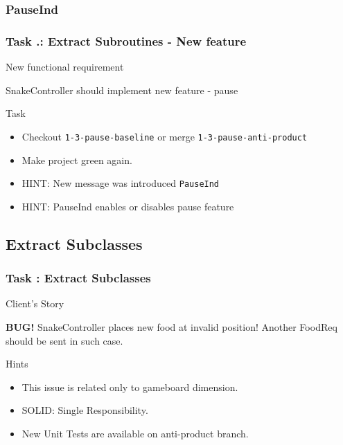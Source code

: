 \documentclass[english]{beamer}
\newenvironment{narrowblock}[1]{%
\begin{center}
\begin{minipage}{10.5cm}
\begin{block}{#1}
}{%
\end{block}
\end{minipage}
\end{center}
}
\begin{document}
\subsubsection{PauseInd}

\begin{frame}
\frametitle{Task \thesubsection.\thesubsubsection: Extract Subroutines - New feature}

\begin{narrowblock}{New functional requirement}
SnakeController should implement new feature - pause
\end{narrowblock}

\pause
\begin{narrowblock}{Task}
\begin{itemize}[<+->]
 \item Checkout \texttt{1-3-pause-baseline} or merge \texttt{1-3-pause-anti-product}
 \item Make project green again.
 \item HINT: New message was introduced \texttt{PauseInd}
 \item HINT: PauseInd enables or disables pause feature
\end{itemize}
\end{narrowblock}
\end{frame}

\subsection{Extract Subclasses}

\begin{frame}
\frametitle{Task \thesubsection: Extract Subclasses}

\begin{narrowblock}{Client's Story}
\textbf{BUG!} SnakeController places new food at invalid position! Another FoodReq should be sent in such case.
\end{narrowblock}

\pause
\begin{narrowblock}{Hints}
\begin{itemize}[<+->]
\item This issue is related only to gameboard dimension.
\item SOLID: Single Responsibility.
\item New Unit Tests are available on anti-product branch.
\end{itemize}
\end{narrowblock}
\end{frame}
\end{document}
